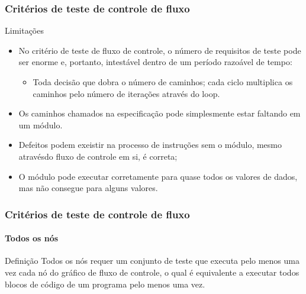 \begin{frame}
\frametitle{Critérios de teste de controle de fluxo}

\begin{block:fact}{Limitações}
\begin{itemize}
	\item No critério de teste de fluxo de controle, o número de requisitos de teste
	pode ser enorme e, portanto, intestável dentro de um período razoável de tempo:
	\begin{itemize}
		\item Toda decisão que dobra o número de caminhos; cada ciclo multiplica
		os caminhos pelo número de iterações através do loop.
	\end{itemize}

	\item Os caminhos chamados na especificação pode simplesmente estar faltando em um módulo.

    \item Defeitos podem exeistir na processo de instruções sem o módulo, mesmo
	atravésdo fluxo de controle em si, é correta;

    \item O módulo pode executar corretamente para quase todos os valores de dados, mas não consegue para alguns valores.
\end{itemize}
\end{block:fact}
\end{frame}



\begin{frame}
\label{concept:all-nodes-criterion}
\label{concept:all-nodes}
\frametitle{Critérios de teste de controle de fluxo}
\framesubtitle{Todos os nós}

\begin{block:concept}{Definição}
Todos os nós requer um conjunto de teste que executa pelo menos uma vez cada nó do 
gráfico de fluxo de controle, o qual é equivalente a executar todos blocos de código de 
um programa pelo menos uma vez.
\end{block:concept}

\hfill
{}
\end{frame}


